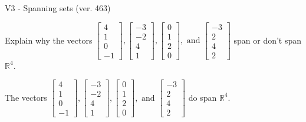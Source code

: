 \begin{exercise}
  \begin{exerciseTitle}V3 - Spanning sets (ver. 463)\end{exerciseTitle}
  \begin{exerciseStatement}
    Explain why the vectors \(\left[\begin{array}{r}
4 \\
1 \\
0 \\
-1
\end{array}\right] , \left[\begin{array}{r}
-3 \\
-2 \\
4 \\
1
\end{array}\right] , \left[\begin{array}{r}
0 \\
1 \\
2 \\
0
\end{array}\right] , \text{ and } \left[\begin{array}{r}
-3 \\
2 \\
4 \\
2
\end{array}\right]\) span or don't span \(\mathbb{R}^4\). 
	


  \end{exerciseStatement}
  \begin{exerciseAnswer}
   The vectors \(\left[\begin{array}{r}
4 \\
1 \\
0 \\
-1
\end{array}\right] , \left[\begin{array}{r}
-3 \\
-2 \\
4 \\
1
\end{array}\right] , \left[\begin{array}{r}
0 \\
1 \\
2 \\
0
\end{array}\right] , \text{ and } \left[\begin{array}{r}
-3 \\
2 \\
4 \\
2
\end{array}\right]\) 
  	 do  
	span \(\mathbb{R}^4\).
  


  \end{exerciseAnswer}
\end{exercise}